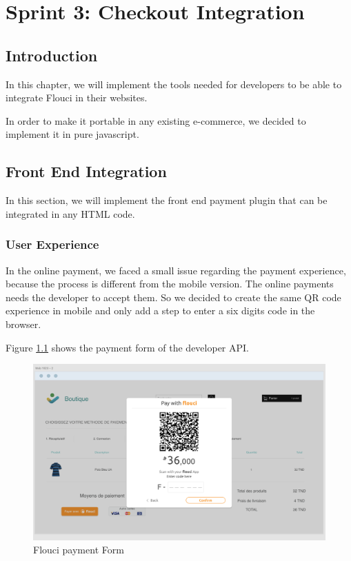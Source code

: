 
\setcounter{chapter}{4}
\chapter{Sprint 3: Checkout Integration}
\minitoc %
\graphicspath{{Chapter5/figures/}}

\pagestyle{fancy}
\fancyhf{}
\fancyhead[R]{\bfseries\rightmark}
\fancyfoot[R]{\thepage}
\renewcommand{\headrulewidth}{0.5pt}
\renewcommand{\footrulewidth}{0pt}
\renewcommand{\chaptermark}[1]{\markboth{\MakeUppercase{\chaptername~\thechapter. #1 }}{}}
\renewcommand{\sectionmark}[1]{\markright{\thechapter.\thesection~ #1}}


\begin{spacing}{1.2}

\section*{Introduction}
In this chapter, we will implement the tools needed for developers to be able to integrate Flouci in their websites. 

In order to make it portable in any existing e-commerce, we decided to implement it in pure javascript.
\section{Front End Integration}
In this section, we will implement the front end payment plugin that  can be integrated in any HTML code.
\subsection{User Experience}
In the online payment, we faced a small issue regarding the payment experience, because the process is different from the mobile version. The online payments needs the developer to accept them.
So we decided to create the same QR code experience in mobile and only add a step to enter a six digits code in the browser.

Figure \ref{fig:onlinepay} shows the payment form of the developer API.
\begin{figure}[H]\centering
\includegraphics[width= \textwidth, keepaspectratio ]{Checkout_screen.png}
\caption{Flouci payment Form}
\label{fig:onlinepay}
\end{figure}


\end{spacing}
